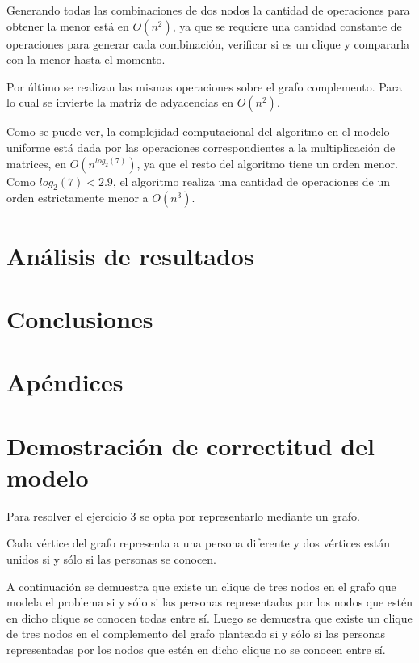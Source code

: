 \documentclass[a4paper, 12pt]{article}
\begin{document}
Generando todas las combinaciones de dos nodos la cantidad de operaciones para obtener la menor est\'a en $O\left(n^2\right)$, ya que se requiere una cantidad constante de operaciones para generar cada combinaci\'on, verificar si es un clique y compararla con la menor hasta el momento.


Por \'ultimo se realizan las mismas operaciones sobre el grafo complemento. Para lo cual se invierte la matriz de adyacencias en $O \left( n^2 \right)$.


Como se puede ver, la complejidad computacional del algoritmo en el modelo uniforme est\'a dada por las operaciones correspondientes a la multiplicaci\'on de matrices, en $O \left( n^{log_2\left(7\right)} \right) $, ya que el resto del algoritmo tiene un orden menor. Como $log_2\left(7\right) < 2.9 $, el algoritmo realiza una cantidad de operaciones de un orden estrictamente menor a $O\left( n^3\right) $.




\section*{An\'alisis de resultados}
\section*{Conclusiones}

\section*{Ap\'endices}
\section{Demostraci\'on de correctitud del modelo}\label{dem_clique}

Para resolver el ejercicio 3 se opta por representarlo mediante un grafo.

Cada v\'ertice del grafo representa a una persona diferente y dos v\'ertices est\'an unidos si y s\'olo si las personas se conocen.


A continuaci\'on se demuestra que existe un clique de tres nodos en el grafo que modela el problema si y s\'olo si las personas representadas por los nodos que est\'en en dicho clique se conocen todas entre s\'i. Luego se demuestra que existe un clique de tres nodos en el complemento del grafo planteado si y s\'olo si las personas representadas por los nodos que est\'en en dicho clique no se conocen entre s\'i.
\end{document}
